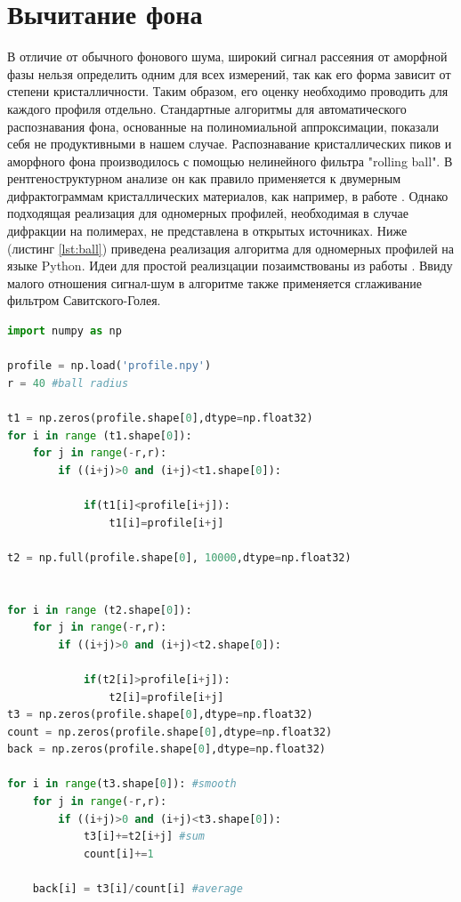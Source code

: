	\section{Вычитание фона}
	
	В отличие от обычного фонового шума, широкий сигнал рассеяния от аморфной фазы нельзя определить одним для всех измерений, так как его форма зависит от степени кристалличности. Таким образом, его оценку необходимо проводить для каждого профиля отдельно.
	Стандартные алгоритмы для автоматического распознавания фона, основанные на полиномиальной аппроксимации, показали себя не продуктивными в нашем случае. Распознавание кристаллических пиков и аморфного фона производилось с помощью нелинейного фильтра "rolling ball". В рентгеноструктурном анализе он как правило применяется к двумерным дифрактограммам кристаллических материалов, как например, в работе \cite{ball2018}. Однако подходящая реализация для одномерных профилей, необходимая в случае дифракции на полимерах, не представлена в открытых источниках. Ниже (листинг \ref{lst:ball}) приведена реализация алгоритма для одномерных профилей на языке Python. 
	Идеи для простой реализцации позаимствованы из работы \cite{ball-code}. Ввиду малого отношения сигнал-шум в алгоритме также применяется сглаживание фильтром Савитского-Голея.
\vspace{5px}
	\begin{lstlisting}[language=Python, caption=Алгоритм распознавания фона, label={lst:ball}]
import numpy as np
 
profile = np.load('profile.npy')
r = 40 #ball radius

t1 = np.zeros(profile.shape[0],dtype=np.float32)
for i in range (t1.shape[0]):
    for j in range(-r,r):
        if ((i+j)>0 and (i+j)<t1.shape[0]):
            
            if(t1[i]<profile[i+j]):
                t1[i]=profile[i+j]
                
t2 = np.full(profile.shape[0], 10000,dtype=np.float32)


for i in range (t2.shape[0]):
    for j in range(-r,r):
        if ((i+j)>0 and (i+j)<t2.shape[0]):
            
            if(t2[i]>profile[i+j]):
                t2[i]=profile[i+j]
t3 = np.zeros(profile.shape[0],dtype=np.float32)
count = np.zeros(profile.shape[0],dtype=np.float32)
back = np.zeros(profile.shape[0],dtype=np.float32)

for i in range(t3.shape[0]): #smooth
    for j in range(-r,r):
        if ((i+j)>0 and (i+j)<t3.shape[0]):
            t3[i]+=t2[i+j] #sum
            count[i]+=1
            
    back[i] = t3[i]/count[i] #average
\end{lstlisting}
\vspace{5px}

